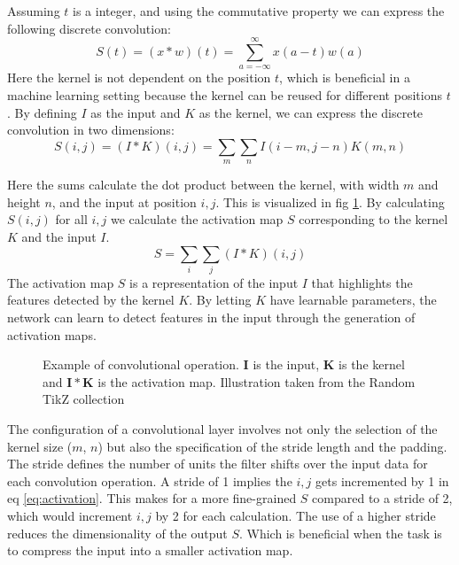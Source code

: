 Assuming $t$ is a integer, and using the commutative property we can express the following discrete convolution:
\begin{equation}
    S(t) = (x*w)(t) = \sum_{a=-\infty}^\infty x(a-t)w(a)
\end{equation}
Here the kernel is not dependent on the position $t$, which is beneficial in a machine learning setting because the kernel can be reused for different positions $t$. 
By defining $I$ as the input and $K$ as the kernel, we can express the discrete convolution in two dimensions:
\begin{equation}
    S(i, j) = (I*K)(i, j) = \sum_m \sum_n I(i-m, j-n)K(m, n)
\end{equation}

Here the sums calculate the dot product between the kernel, with width $m$ and height $n$, and the input at position $i, j$. This is visualized in fig \ref{fig:conv}. By calculating $S(i, j)$ for all $i, j$ we calculate the activation map $S$ corresponding to the kernel $K$ and the input $I$.
\begin{equation}
    S = \sum_i \sum_j (I*K)(i, j)
    \label{eq:activation}
\end{equation}
The activation map $S$ is a representation of the input $I$ that highlights the features detected by the kernel $K$. 
By letting $K$ have learnable parameters, the network can learn to detect features in the input through the generation of activation maps.

\begin{figure}[H]
    \centering
    
    \caption{Example of convolutional operation. $\mathbf{I}$ is the input, $\mathbf{K}$ is the kernel and $\mathbf{I} * \mathbf{K}$ is the activation map. Illustration taken from the Random TikZ collection\cite{RiebesellTikZ2022}}
    \label{fig:conv}
\end{figure}

The configuration of a convolutional layer involves not only the selection of the kernel size ($m$, $n$) but also the specification of the stride length and the padding. 
The stride defines the number of units the filter shifts over the input data for each convolution operation. A stride of 1 implies the $i,j$ gets incremented by 1 in eq \ref{eq:activation}.
This makes for a more fine-grained $S$ compared to a stride of 2, which would increment $i,j$ by 2 for each calculation. The use of a higher stride reduces the dimensionality of the output $S$.
Which is beneficial when the task is to compress the input into a smaller activation map.

